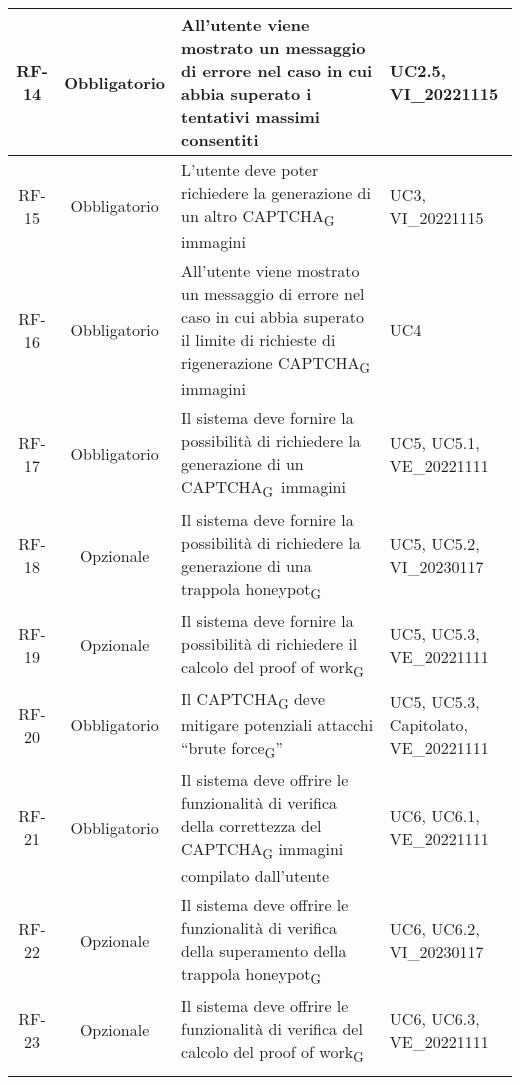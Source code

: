\begin{tabularx}{\textwidth}{| c | c | X | X |}
   \hline
 RF-14 & Obbligatorio & All'utente viene mostrato un messaggio di errore nel caso in cui abbia superato i tentativi massimi consentiti &  UC2.5, VI\_20221115\\
 \hline
 RF-15 & Obbligatorio & L'utente deve poter richiedere la generazione di un altro CAPTCHA\textsubscript{G} immagini &  UC3, VI\_20221115\\
 \hline
 RF-16 & Obbligatorio & All'utente viene mostrato un messaggio di errore nel caso in cui abbia superato il limite di richieste di rigenerazione CAPTCHA\textsubscript{G} immagini &  UC4\\
 \hline
 RF-17 & Obbligatorio & Il sistema deve fornire la possibilità di richiedere la generazione di un CAPTCHA\textsubscript{G}\ immagini & UC5, UC5.1, VE\_20221111\\
 \hline
 RF-18 & Opzionale & Il sistema deve fornire la possibilità di richiedere la generazione di una trappola honeypot\textsubscript{G} & UC5, UC5.2, VI\_20230117\\
  \hline
 RF-19 & Opzionale & Il sistema deve fornire la possibilità di richiedere il calcolo del proof of work\textsubscript{G} & UC5, UC5.3, VE\_20221111\\
 \hline
 RF-20 & Obbligatorio & Il CAPTCHA\textsubscript{G} deve mitigare potenziali attacchi “brute force\textsubscript{G}” & UC5, UC5.3, Capitolato, VE\_20221111\\
 \hline
 RF-21 & Obbligatorio & Il sistema deve offrire le funzionalità di verifica della correttezza del CAPTCHA\textsubscript{G} immagini compilato dall'utente & UC6, UC6.1, VE\_20221111\\
 \hline
 RF-22 & Opzionale & Il sistema deve offrire le funzionalità di verifica della superamento della trappola honeypot\textsubscript{G} & UC6, UC6.2, VI\_20230117\\
 \hline
 RF-23 & Opzionale & Il sistema deve offrire le funzionalità di verifica del calcolo del proof of work\textsubscript{G} & UC6, UC6.3, VE\_20221111\\
 \hline
 \caption{Requisiti\textsubscript{G} funzionali}
\end{tabularx}

